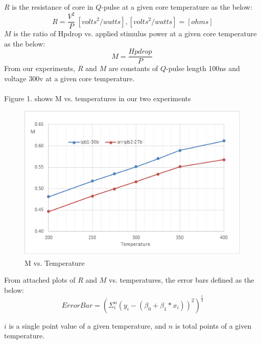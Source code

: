 \documentclass{article}
\begin{document}
$R$ is the resistance of core in $Q$-pulse at a given core temperature as the below:
\begin{equation}
R=\frac{V^{2}}{P}\ [volts^{2}/watts], [volts^{2}/watts]=[ohms]\label{3}%
\end{equation}
%
$M$ is the ratio of Hpdrop vs. applied stimulus power at a given core temperature as the below:
\begin{equation}
M=\frac{Hpdrop}{P}\ \label{4}%
\end{equation}
%
From our experiments, $R$ and $M$ are constants of $Q$-pulse length 100ns and voltage 300v at a given core temperature.\\
\\
Figure 1. shows M vs. temperatures in our two experiments 
\begin{figure}
[h]
\begin{center}
\includegraphics[scale=1]{m.png} 
\caption{M vs. Temperature }%
\end{center}
\end{figure}
From attached plots of $R$ and $M$ vs. temperatures, the error bars defined as the below:
\begin{equation}
ErrorBar=(\Sigma_{i}^{n}{(y_{i}-(\beta_{0}+\beta_{1}*x_{i}))^{2}})^\frac{1}{2}\label{3}%
\end{equation}

$i$ is a single point value of a given temperature, and $n$ is total points of a given temperature. \\
\end{document}
